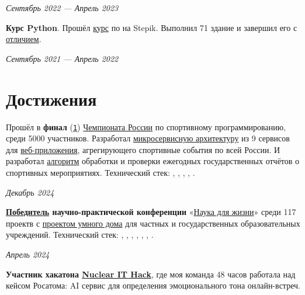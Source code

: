 \documentclass[margin,line]{resume}
\begin{document}
\begin{resume}
  \hfill \textsl{Сентябрь 2022 — Апрель 2023}

  \textbf{Курс Python}. Прошёл
  \href{https://stepik.org/course/67}{курс} по  на
  Stepik. Выполнил 71
  здание и завершил его с
  \href{https://github.com/alchemmist/CV/blob/main/attachments/stepik-python-course.pdf}{отличием}.

  \vspace{-7mm}

  \hfill \textsl{Сентябрь 2021 — Апрель 2022}

  \section{\mysidestyle Достижения}
  Прошёл в
  \textbf{финал}
  (\href{https://github.com/alchemmist/CV/blob/main/attachments/russian-chemp-final.pdf}{\texttt{1}})
  \href{https://events.fsp-russia.com/championship}{Чемпионата
  России} по спортивному
  программированию, среди 5000 участников. Разработал
  \href{https://github.com/alchemmist/CV/blob/main/attachments/architect.pdf}{микросервисную
  архитектуру} из 9 сервисов для
  \href{https://github.com/alchemmist/sportprog}{веб-приложения},
  агрегирующего спортивные события по
  всей России. И разработал
  \href{https://github.com/alchemmist/sport-afisha/blob/main/event_parsing_service/parse_pdf.py}{алгоритм}
  обработки и проверки ежегодных
  государственных
  отчётов о спортивных мероприятиях. Технический стек:
  , ,
  ,
  ,
  .

  \vspace{-6mm}

  \hfill \textsl{Декабрь 2024}

  \textbf{\href{https://github.com/alchemmist/CV/blob/main/attachments/scince-for-life-win.pdf}{Победитель}
  научно-практической конференции}
  «\href{https://conf.profil.mos.ru/academ}{Наука для
  жизни}» среди 117 проектв с
  \href{https://github.com/smart-cab/}{проектом умного
  дома} для частных и государственных
  образовательных учреждений. Технический стек: ,
  , , ,
  , , .
  \vspace{-6mm}

  \hfill \textsl{Апрель 2024}

  \textbf{Участник хакатона \href{https://nuclearhack.mephi.ru/}{Nuclear
  IT Hack}}, где моя команда 48 часов работала
  над кейсом Росатома: AI сервис для определения эмоционального тона онлайн-встреч.


\end{resume}
\end{document}
